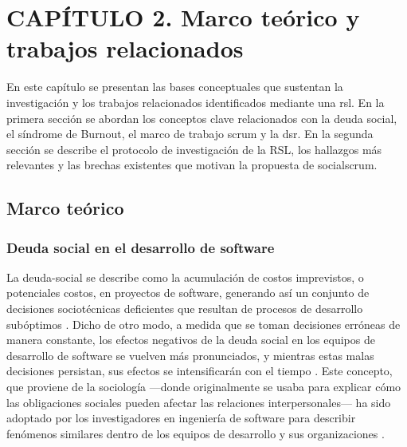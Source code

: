\chapter*{CAPÍTULO 2. Marco teórico y trabajos relacionados}
\setcounter{chapter}{2}
\setcounter{section}{0}
\setcounter{subsection}{0}
\setcounter{subsubsection}{0}
\setcounter{figure}{0}
\setcounter{table}{0}
\renewcommand{\thesection}{\thechapter.\arabic{section}}
\renewcommand{\thesubsection}{\thesection.\arabic{subsection}}
\renewcommand{\thesubsubsection}{\thesubsection.\arabic{subsubsection}}
\makeatletter
\protected@edef\@currentlabel{\thechapter}%
\makeatother
\label{chap:capitulo2}

En este capítulo se presentan las bases conceptuales que sustentan la investigación y los trabajos relacionados identificados mediante una \acrfull{rsl}. En la primera sección se abordan los conceptos clave relacionados con la deuda social, el síndrome de Burnout, el marco de trabajo \gls{scrum} y la \gls{dsr}. En la segunda sección se describe el protocolo de investigación de la RSL, los hallazgos más relevantes y las brechas existentes que motivan la propuesta de \gls{socialscrum}.

\section{Marco teórico}
\subsection{Deuda social en el desarrollo de software}

La \gls{deuda-social} se describe como la acumulación de costos imprevistos, o potenciales costos, en proyectos de software, generando así un conjunto de decisiones sociotécnicas deficientes que resultan de procesos de desarrollo subóptimos \cite{caballero2022communitysmells}. Dicho de otro modo, a medida que se toman decisiones erróneas de manera constante, los efectos negativos de la deuda social en los equipos de desarrollo de software se vuelven más pronunciados, y mientras estas malas decisiones persistan, sus efectos se intensificarán con el tiempo \cite{caballero2021thesis}. Este concepto, que proviene de la sociología —donde originalmente se usaba para explicar cómo las obligaciones sociales pueden afectar las relaciones interpersonales— ha sido adoptado por los investigadores en ingeniería de software para describir fenómenos similares dentro de los equipos de desarrollo y sus organizaciones \cite{caballero2022communitysmells}.

